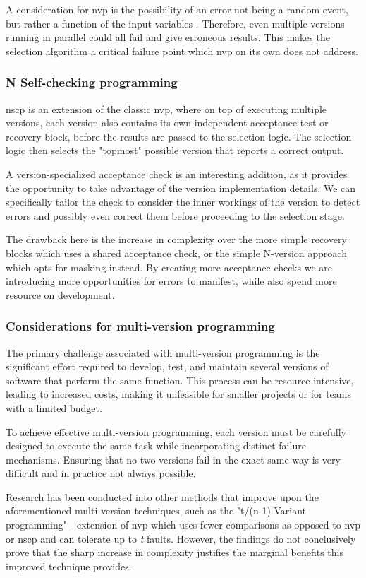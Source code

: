 A consideration for \acrshort{nvp} is the possibility of an error not being a random event, but rather a function of the input variables \cite{5326}. Therefore, even multiple versions running in parallel could all fail and give erroneous results. This makes the selection algorithm a critical failure point which \acrshort{nvp} on its own does not address.

\subsubsection{N Self-checking programming}

\Acrfull{nscp} \cite{nscp} is an extension of the classic \acrshort{nvp}, where on top of executing multiple versions, each version also contains its own independent acceptance test or recovery block, before the results are passed to the selection logic. The selection logic then selects the "topmost" possible version that reports a correct output.

A version-specialized acceptance check is an interesting addition, as it provides the opportunity to take advantage of the version implementation details. We can specifically tailor the check to consider the inner workings of the version to detect errors and possibly even correct them before proceeding to the selection stage.

The drawback here is the increase in complexity over the more simple recovery blocks which uses a shared acceptance check, or the simple N-version approach which opts for masking instead. By creating more acceptance checks we are introducing more opportunities for errors to manifest, while also spend more resource on development.


\subsubsection{Considerations for multi-version programming}

The primary challenge associated with multi-version programming is the significant effort required to develop, test, and maintain several versions of software that perform the same function. This process can be resource-intensive, leading to increased costs, making it unfeasible for smaller projects or for teams with a limited budget.

To achieve effective multi-version programming, each version must be carefully designed to execute the same task while incorporating distinct failure mechanisms. Ensuring that no two versions fail in the exact same way is very difficult and in practice not always possible.

Research has been conducted into other methods that improve upon the aforementioned multi-version techniques, such as the "t/(n-1)-Variant programming" \cite{589928} - extension of \acrshort{nvp} which uses fewer comparisons as opposed to \acrshort{nvp} or \acrshort{nscp} and can tolerate up to \textit{t} faults. However, the findings do not conclusively prove that the sharp increase in complexity justifies the marginal benefits this improved technique provides.